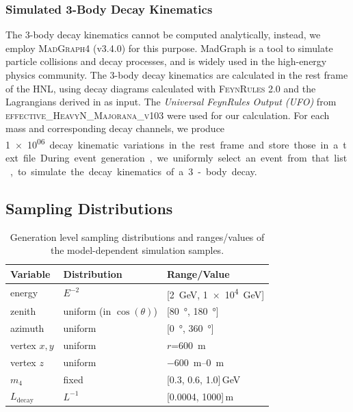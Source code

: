 \subsubsection{Simulated 3-Body Decay Kinematics}

The 3-body decay kinematics cannot be computed analytically, instead, we employ \textsc{MadGraph4} (v3.4.0) \cite{madgraph4} for this purpose. MadGraph is a tool to simulate particle collisions and decay processes, and is widely used in the high-energy physics community. The 3-body decay kinematics are calculated in the rest frame of the HNL, using decay diagrams calculated with \textsc{FeynRules 2.0}  and the Lagrangians derived in  as input. The \textit{Universal FeynRules Output (UFO)} from \textsc{effective\_HeavyN\_Majorana\_v103} were used for our calculation. For each mass and corresponding decay channels, we produce \SI{1e06} decay kinematic variations in the rest frame and store those in a text file. During event generation, we uniformly select an event from that list, to simulate the decay kinematics of a 3-body decay.


\subsection{Sampling Distributions} 

\begin{table}[H]
    \centering
    \begin{tabular} { lll }
        \hline \hline 
        \textbf{Variable} & \textbf{Distribution} & \textbf{Range/Value} \\
        \hline \hline 
        energy & $E^{-2}$ & [\SI{2}{\GeV}, \SI{1e4}{\GeV}] \\
        zenith & uniform (in $\cos(\theta)$) & [\SI{80}{\degree}, \SI{180}{\degree}] \\
        azimuth & uniform & [\SI{0}{\degree}, \SI{360}{\degree}] \\
        vertex $x,y$ & uniform & $r$=\SI{600}{\metre} \\
        vertex $z$ & uniform & \SIrange{-600}{0}{\metre} \\
        $m_\mathrm{4}$ & fixed & [0.3, 0.6, 1.0]\,\si{\GeV} \\
        $L_\mathrm{decay}$ & $L^{-1}$ & [0.0004, 1000]\,\si{\metre} \\
        \hline
    \end{tabular}
    \caption[Model-dependent simulation sampling distributions]{Generation level sampling distributions and ranges/values of the model-dependent simulation samples.}
\end{table}

